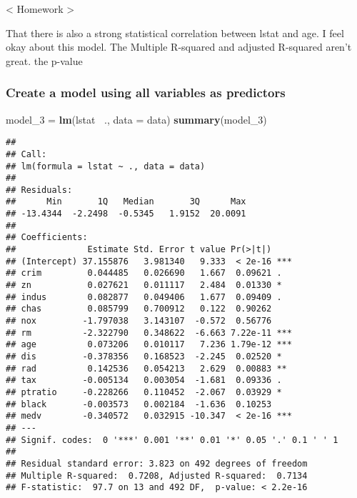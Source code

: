 \documentclass[]{article}
\newenvironment{Shaded}{\begin{snugshade}}{\end{snugshade}}
\newcommand{\DataTypeTok}[1]{\textcolor[rgb]{0.13,0.29,0.53}{#1}}
\newcommand{\DecValTok}[1]{\textcolor[rgb]{0.00,0.00,0.81}{#1}}
\newcommand{\KeywordTok}[1]{\textcolor[rgb]{0.13,0.29,0.53}{\textbf{#1}}}
\newcommand{\NormalTok}[1]{#1}
\newcommand{\OperatorTok}[1]{\textcolor[rgb]{0.81,0.36,0.00}{\textbf{#1}}}
\newcommand{\StringTok}[1]{\textcolor[rgb]{0.31,0.60,0.02}{#1}}
\begin{document}
\textless{} Homework \textgreater{}

That there is also a strong statistical correlation between lstat and
age. I feel okay about this model. The Multiple R-squared and adjusted
R-squared aren't great. the p-value

\hypertarget{create-a-model-using-all-variables-as-predictors}{%
\subsubsection{Create a model using all variables as
predictors}\label{create-a-model-using-all-variables-as-predictors}}

\begin{Shaded}
\begin{Highlighting}[]
\NormalTok{model_}\DecValTok{3}\NormalTok{ =}\StringTok{ }\KeywordTok{lm}\NormalTok{(lstat }\OperatorTok{~}\NormalTok{., }\DataTypeTok{data =}\NormalTok{ data)}
\KeywordTok{summary}\NormalTok{(model_}\DecValTok{3}\NormalTok{)}
\end{Highlighting}
\end{Shaded}

\begin{verbatim}
## 
## Call:
## lm(formula = lstat ~ ., data = data)
## 
## Residuals:
##      Min       1Q   Median       3Q      Max 
## -13.4344  -2.2498  -0.5345   1.9152  20.0091 
## 
## Coefficients:
##              Estimate Std. Error t value Pr(>|t|)    
## (Intercept) 37.155876   3.981340   9.333  < 2e-16 ***
## crim         0.044485   0.026690   1.667  0.09621 .  
## zn           0.027621   0.011117   2.484  0.01330 *  
## indus        0.082877   0.049406   1.677  0.09409 .  
## chas         0.085799   0.700912   0.122  0.90262    
## nox         -1.797038   3.143107  -0.572  0.56776    
## rm          -2.322790   0.348622  -6.663 7.22e-11 ***
## age          0.073206   0.010117   7.236 1.79e-12 ***
## dis         -0.378356   0.168523  -2.245  0.02520 *  
## rad          0.142536   0.054213   2.629  0.00883 ** 
## tax         -0.005134   0.003054  -1.681  0.09336 .  
## ptratio     -0.228266   0.110452  -2.067  0.03929 *  
## black       -0.003573   0.002184  -1.636  0.10253    
## medv        -0.340572   0.032915 -10.347  < 2e-16 ***
## ---
## Signif. codes:  0 '***' 0.001 '**' 0.01 '*' 0.05 '.' 0.1 ' ' 1
## 
## Residual standard error: 3.823 on 492 degrees of freedom
## Multiple R-squared:  0.7208, Adjusted R-squared:  0.7134 
## F-statistic:  97.7 on 13 and 492 DF,  p-value: < 2.2e-16
\end{verbatim}
\end{document}
